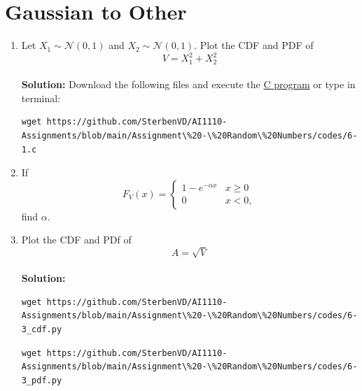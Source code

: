 \documentclass[journal,12pt,twocolumn]{IEEEtran}
\numberwithin{equation}{section}
\renewcommand\thesection{\arabic{section}}
\providecommand{\gauss}[2]{\mathcal{N}\ensuremath{\left(#1,#2\right)}}
\providecommand{\gitlink}[2]{{\color{blue}\href{https://github.com/SterbenVD/AI1110-Assignments/blob/main/Assignment\%20-\%20Random\%20Numbers/#1}{#2}}}
\newcommand{\solution}{\noindent \textbf{Solution: }}
\begin{document}
\section{Gaussian to Other}
\begin{enumerate}[label=\thesection.\arabic*
        ,ref=\thesection.\theenumi]
    \item
          Let $X_1 \sim  \gauss{0}{1}$ and $X_2 \sim  \gauss{0}{1}$. Plot the CDF and PDF of
          \begin{equation}
              V = X_1^2 + X_2^2
          \end{equation} \\
          \solution Download the following files and execute the \gitlink{codes/6-1.c}{C program} or type in terminal:
          \begin{lstlisting}
wget https://github.com/SterbenVD/AI1110-Assignments/blob/main/Assignment\%20-\%20Random\%20Numbers/codes/6-1.c
                    \end{lstlisting}

    \item
          If
          \begin{equation}
              F_{V}(x) =
              \begin{cases}
                  1 - e^{-\alpha x} & x \geq 0 \\
                  0                 & x < 0,
              \end{cases}
          \end{equation}
          find $\alpha$.
    \item
          \label{ch3_raleigh_sim}
          Plot the CDF and PDf of
          \begin{equation}
              A = \sqrt{V}
          \end{equation}\\
          \solution
          \begin{lstlisting}
wget https://github.com/SterbenVD/AI1110-Assignments/blob/main/Assignment\%20-\%20Random\%20Numbers/codes/6-3_cdf.py
            \end{lstlisting}
          \begin{lstlisting}
wget https://github.com/SterbenVD/AI1110-Assignments/blob/main/Assignment\%20-\%20Random\%20Numbers/codes/6-3_pdf.py
              \end{lstlisting}
\end{enumerate}
\end{document}

